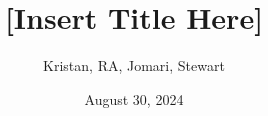 \documentclass[10pt,a4paper]{article}
\title{[Insert Title Here]}
\author{Kristan, RA, Jomari, Stewart}
\date{August 30, 2024}
\begin{document}
	\begin{titlingpage}
	\maketitle
	\end{titlingpage}
	
	\newpage
	\tableofcontents
	
	\newpage
	
	
	\newpage
	
	
	\newpage
	
	
	\newpage
	
	
\end{document}
